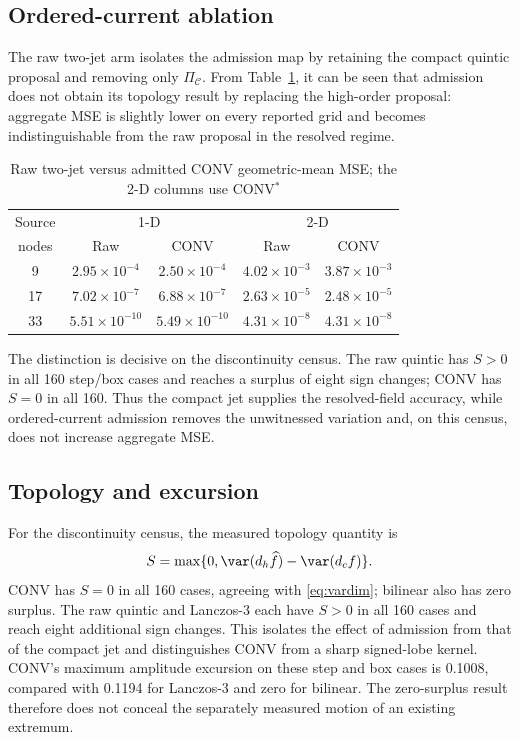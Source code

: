 \subsection{Ordered-current ablation}

The raw two-jet arm isolates the admission map by retaining the compact
quintic proposal and removing only \(\Pi_{\mathcal C}\). From
Table~\ref{tab:projectionablation}, it can be seen that admission does not
obtain its topology result by replacing the high-order proposal: aggregate
MSE is slightly lower on every reported grid and becomes indistinguishable
from the raw proposal in the resolved regime.

\begin{table}[H]
\caption{Raw two-jet versus admitted CONV geometric-mean MSE; the 2-D columns use CONV$^{*}$}
\label{tab:projectionablation}
\centering
\scriptsize
\setlength{\tabcolsep}{4.0pt}
\begin{tabular}{c|cc|cc}
\hline
Source & \multicolumn{2}{c|}{1-D} & \multicolumn{2}{c}{2-D} \\
nodes & Raw & CONV & Raw & CONV \\
\hline
9  & $2.95\!\times\!10^{-4}$ & $2.50\!\times\!10^{-4}$ &
     $4.02\!\times\!10^{-3}$ & $3.87\!\times\!10^{-3}$ \\
17 & $7.02\!\times\!10^{-7}$ & $6.88\!\times\!10^{-7}$ &
     $2.63\!\times\!10^{-5}$ & $2.48\!\times\!10^{-5}$ \\
33 & $5.51\!\times\!10^{-10}$ & $5.49\!\times\!10^{-10}$ &
     $4.31\!\times\!10^{-8}$ & $4.31\!\times\!10^{-8}$ \\
\hline
\end{tabular}
\end{table}

The distinction is decisive on the discontinuity census. The raw quintic
has \(S>0\) in all 160 step/box cases and reaches a surplus of eight sign
changes; CONV has \(S=0\) in all 160. Thus the compact jet supplies the
resolved-field accuracy, while ordered-current admission removes the
unwitnessed variation and, on this census, does not increase aggregate MSE.

\subsection{Topology and excursion}

For the discontinuity census, the measured topology quantity is
\begin{equation}
 S=\max\{0,\var(d_h\widehat f)-\var(d_cf)\}.
 \label{eq:measuredsurplus}
\end{equation}
CONV has $S=0$ in all 160 cases, agreeing with
\eqref{eq:vardim}; bilinear also has zero surplus. The raw quintic and
Lanczos-3 each have $S>0$ in all 160 cases and reach eight additional sign
changes. This isolates the effect of admission from that of the compact jet
and distinguishes CONV from a sharp signed-lobe kernel.
CONV's maximum amplitude excursion on these step and box cases is 0.1008,
compared with 0.1194 for Lanczos-3 and zero for bilinear. The zero-surplus
result therefore does not conceal the separately measured motion of an
existing extremum.

